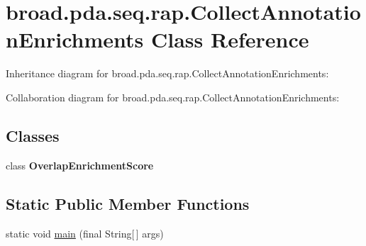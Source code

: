 \hypertarget{classbroad_1_1pda_1_1seq_1_1rap_1_1_collect_annotation_enrichments}{\section{broad.\+pda.\+seq.\+rap.\+Collect\+Annotation\+Enrichments Class Reference}
\label{classbroad_1_1pda_1_1seq_1_1rap_1_1_collect_annotation_enrichments}
}


Inheritance diagram for broad.\+pda.\+seq.\+rap.\+Collect\+Annotation\+Enrichments\+:


Collaboration diagram for broad.\+pda.\+seq.\+rap.\+Collect\+Annotation\+Enrichments\+:
\subsection*{Classes}
\begin{DoxyCompactItemize}
\item 
class {\bfseries Overlap\+Enrichment\+Score}
\end{DoxyCompactItemize}
\subsection*{Static Public Member Functions}
\begin{DoxyCompactItemize}
\item 
static void \hyperlink{classbroad_1_1pda_1_1seq_1_1rap_1_1_collect_annotation_enrichments_a73d43a1211300cc802832977f7de8d5a}{main} (final String\mbox{[}$\,$\mbox{]} args)
\end{DoxyCompactItemize}
